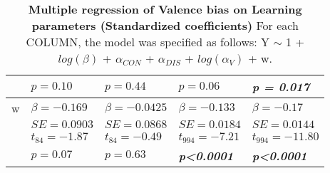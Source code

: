 \begin{table}
\begin{tabular}{r|llll}
&$p=0.10$&$p=0.44$&$p=0.06$&\textbf{\textit{p = 0.017}}\\
\hline w&$\beta=-0.169$&$\beta=-0.0425$&$\beta=-0.133$&$\beta=-0.17$\\
&$SE=0.0903$&$SE=0.0868$&$SE=0.0184$&$SE=0.0144$\\
&$t_{84}=-1.87$&$t_{84}=-0.49$&$t_{994}=-7.21$&$t_{994}=-11.80$\\
&$p=0.07$&$p=0.63$&\textbf{\textit{p\textless0.0001}}&\textbf{\textit{p\textless0.0001}}\\
\hline \hline
\end{tabular}
\caption{\textbf{Multiple regression of Valence bias on Learning parameters (Standardized coefficients)} For each COLUMN, the model was specified as follows: Y $\sim$ 1 + $log(\beta)$ + $\alpha_{CON}$ + $\alpha_{DIS}$ + $log(\alpha_V)$ + w.}
\label{tab:Multiple regressionValence bias}
\end{table}
% 
% 
